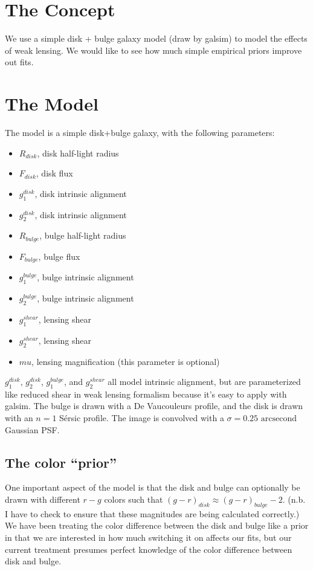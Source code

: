 \documentclass{article}
\begin{document}
\section{The Concept}
We use a simple disk + bulge galaxy model (draw by galsim) to model
the effects of weak lensing.  We would like to see how much simple
empirical priors improve out fits.

\section{The Model}
The model is a simple disk+bulge galaxy, with the following parameters:
\begin{itemize}
\item $R_{disk}$, disk half-light radius
\item $F_{disk}$, disk flux
\item $g_1^{disk}$, disk intrinsic alignment
\item $g_2^{disk}$, disk intrinsic alignment
\item $R_{bulge}$, bulge half-light radius
\item $F_{bulge}$, bulge flux
\item $g_1^{bulge}$, bulge intrinsic alignment
\item $g_2^{bulge}$, bulge intrinsic alignment
\item $g_1^{shear}$, lensing shear
\item $g_2^{shear}$, lensing shear
\item $mu$, lensing magnification (this parameter is optional)
\end{itemize}
$g_1^{disk}$, $g_2^{disk}$, $g_1^{bulge}$, and $g_2^{shear}$ all model
intrinsic alignment, but are parameterized like reduced shear in weak
lensing formalism because it's easy to apply with galsim.  The bulge
is drawn with a De Vaucouleurs profile, and the disk is drawn with an
$n=1$ S\'{e}rsic profile.  The image is convolved with a $\sigma = 0.25
\textrm{ arcsecond}$ Gaussian PSF.

\subsection{The color ``prior''}
One important aspect of the model is that the disk and bulge can
optionally be drawn with different $r-g$ colors such that
$(g-r)_{disk} \approx (g-r)_{bulge} - 2$. (n.b. I have to check to
ensure that these magnitudes are being calculated correctly.)  We have
been treating the color difference between the disk and bulge like a
prior in that we are interested in how much switching it on affects
our fits, but our current treatment presumes perfect knowledge of the
color difference between disk and bulge.
\end{document}
